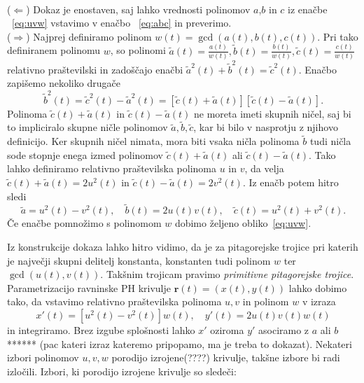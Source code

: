 \documentclass[isrm2, tisk]{fmfdelo}
\begin{document}
    \begin{dokaz}
        \mbox{}\\
        ($\Leftarrow$) Dokaz je enostaven, saj lahko vrednosti polinomov $a$,$b$ in $c$ iz enačbe ~\eqref{eq:uvw} vstavimo v enačbo ~\eqref{eq:abc} in preverimo. \\
        ($\Rightarrow$) Najprej definiramo polinom $w(t)=\gcd(a(t),b(t),c(t))$.
        Pri tako definiranem polinomu $w$, so polinomi $\tilde{a}(t)=\frac{a(t)}{w(t)}, \tilde{b}(t)=\frac{b(t)}{w(t)}, \tilde{c}(t)=\frac{c(t)}{w(t)}$ relativno praštevilski in zadoščajo enačbi $\tilde{a}^2(t)+\tilde{b}^2(t)=\tilde{c}^2(t)$.
        Enačbo zapišemo nekoliko drugače \[\tilde{b}^2(t)= \tilde{c}^2(t)-\tilde{a}^2(t) = [\tilde{c}(t)+\tilde{a}(t)][\tilde{c}(t)-\tilde{a}(t)].\]
        Polinoma $\tilde{c}(t)+\tilde{a}(t)$ in $\tilde{c}(t)-\tilde{a}(t)$ ne moreta imeti skupnih ničel, saj bi to impliciralo skupne ničle polinomov $\tilde{a},\tilde{b},\tilde{c}$, kar bi bilo v nasprotju z njihovo definicijo.
        Ker skupnih ničel nimata, mora biti vsaka ničla polinoma $\tilde{b}$ tudi ničla sode stopnje enega izmed polinomov $\tilde{c}(t)+\tilde{a}(t)$ ali $\tilde{c}(t)-\tilde{a}(t)$.
        Tako lahko definiramo relativno praštevilska polinoma $u$ in $v$, da velja $\tilde{c}(t)+\tilde{a}(t)=2u^2(t)$ in $\tilde{c}(t)-\tilde{a}(t)=2v^2(t)$.
        Iz enačb potem hitro sledi \[\tilde{a}=u^2(t)-v^2(t),\quad\tilde{b}(t)=2u(t)v(t), \quad\tilde{c}(t)=u^2(t)+v^2(t).\]
        Če enačbe pomnožimo s polinomom $w$ dobimo željeno obliko~\eqref{eq:uvw}. \qedhere
    \end{dokaz}
    Iz konstrukcije dokaza lahko hitro vidimo, da je za pitagorejske trojice pri katerih je največji skupni delitelj konstanta, konstanten tudi polinom $w$ ter $\gcd(u(t),v(t))$.
    Takšnim trojicam pravimo \textit{primitivne pitagorejske trojice}.
    Parametrizacijo ravninske PH krivulje $\mathbf{r}(t)=(x(t),y(t))$ lahko dobimo tako, da vstavimo relativno praštevilska polinoma $u,v$ in polinom $w$ v izraza \[x'(t)=[u^2(t)-v^2(t)]w(t),\quad y'(t)=2u(t)v(t)w(t)\] in integriramo.
    Brez izgube splošnosti lahko $x'$ oziroma $y'$ asociramo z $a$ ali $b$****** (pac kateri izraz kateremo pripopamo, ma je treba to dokazat).
    Nekateri izbori polinomov $u,v,w$ porodijo izrojene(????) krivulje, takšne izbore bi radi izločili.
    Izbori, ki porodijo izrojene krivulje so sledeči:
    \vspace{-0.3cm}
\end{document}
